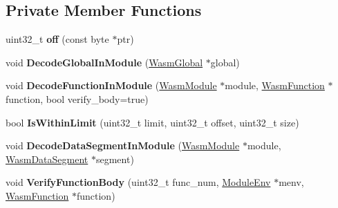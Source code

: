 \subsection*{Private Member Functions}
\begin{DoxyCompactItemize}
\item 
uint32\+\_\+t {\bfseries off} (const byte $\ast$ptr)\hypertarget{classv8_1_1internal_1_1wasm_1_1_module_decoder_af462e5c822e57a511ae24d054e9ad390}{}\label{classv8_1_1internal_1_1wasm_1_1_module_decoder_af462e5c822e57a511ae24d054e9ad390}

\item 
void {\bfseries Decode\+Global\+In\+Module} (\hyperlink{structv8_1_1internal_1_1wasm_1_1_wasm_global}{Wasm\+Global} $\ast$global)\hypertarget{classv8_1_1internal_1_1wasm_1_1_module_decoder_a07dcab56eb315870e8da224309973349}{}\label{classv8_1_1internal_1_1wasm_1_1_module_decoder_a07dcab56eb315870e8da224309973349}

\item 
void {\bfseries Decode\+Function\+In\+Module} (\hyperlink{structv8_1_1internal_1_1wasm_1_1_wasm_module}{Wasm\+Module} $\ast$module, \hyperlink{structv8_1_1internal_1_1wasm_1_1_wasm_function}{Wasm\+Function} $\ast$function, bool verify\+\_\+body=true)\hypertarget{classv8_1_1internal_1_1wasm_1_1_module_decoder_abf9e2c2a99c84851ee240aae51c683a2}{}\label{classv8_1_1internal_1_1wasm_1_1_module_decoder_abf9e2c2a99c84851ee240aae51c683a2}

\item 
bool {\bfseries Is\+Within\+Limit} (uint32\+\_\+t limit, uint32\+\_\+t offset, uint32\+\_\+t size)\hypertarget{classv8_1_1internal_1_1wasm_1_1_module_decoder_a3615e93a7d266e0b87b00d17da0ea1f2}{}\label{classv8_1_1internal_1_1wasm_1_1_module_decoder_a3615e93a7d266e0b87b00d17da0ea1f2}

\item 
void {\bfseries Decode\+Data\+Segment\+In\+Module} (\hyperlink{structv8_1_1internal_1_1wasm_1_1_wasm_module}{Wasm\+Module} $\ast$module, \hyperlink{structv8_1_1internal_1_1wasm_1_1_wasm_data_segment}{Wasm\+Data\+Segment} $\ast$segment)\hypertarget{classv8_1_1internal_1_1wasm_1_1_module_decoder_a121595867746b79f35e6bc046d1cb8e2}{}\label{classv8_1_1internal_1_1wasm_1_1_module_decoder_a121595867746b79f35e6bc046d1cb8e2}

\item 
void {\bfseries Verify\+Function\+Body} (uint32\+\_\+t func\+\_\+num, \hyperlink{structv8_1_1internal_1_1wasm_1_1_module_env}{Module\+Env} $\ast$menv, \hyperlink{structv8_1_1internal_1_1wasm_1_1_wasm_function}{Wasm\+Function} $\ast$function)\hypertarget{classv8_1_1internal_1_1wasm_1_1_module_decoder_aeb358635aa9cdf10d22232d14cb8ee8b}{}\label{classv8_1_1internal_1_1wasm_1_1_module_decoder_aeb358635aa9cdf10d22232d14cb8ee8b}


\end{DoxyCompactItemize}
